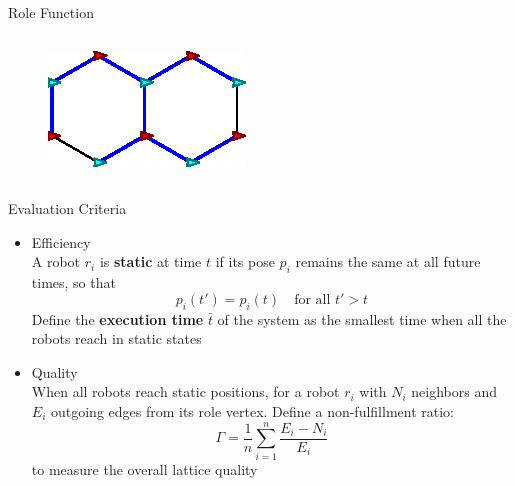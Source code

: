 \documentclass[10pt]{beamer}
\begin{document}
\begin{frame}{Role Function}
\begin{columns}[T]
\begin{column}{.5\textwidth}
\begin{figure}
      \end{figure}
      \begin{figure}
        \centering
        \includegraphics[scale=0.8]{figs/good-hexagon}
        \end{figure}
    \end{column}%
  \end{columns}
\end{frame}

\begin{frame}{Evaluation Criteria}
  \begin{itemize}
  \item Efficiency\\
    A robot $r_i$ is \textbf{static} at time $t$ if its pose $p_i$
    remains the same at all future times, so that 
    $$p_i(t') = p_i(t) \quad \mbox {for all } t' > t$$    
  Define the \textbf{execution time} $\bar{t}$ of the system as the smallest time
  when all the robots reach in static states
  \item Quality \\
    When all robots reach static positions, for a robot $r_i$
    with $N_i$ neighbors and $E_i$ outgoing edges from its role vertex. 
    Define a non-fulfillment ratio:
    $$\Gamma = \dfrac{1}{n}\sum\limits_{i=1}^n \frac{E_i - N_i}{E_i}$$
    to measure the overall lattice quality
  \end{itemize}
  
\end{frame}
\end{document}
